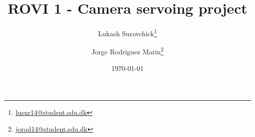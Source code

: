 \title{ROVI 1 - Camera servoing project}
\date{\today}
\author{Lukash Surovchick\thanks{\url{lusur14@student.sdu.dk}}}
\author{Jorge Rodriguez Marin\thanks{\url{jorod14@student.sdu.dk}}}

